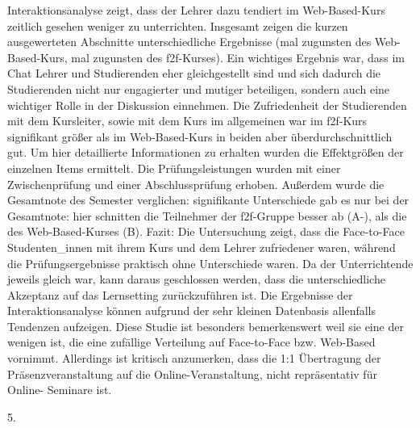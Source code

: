 \documentclass[12pt, bibliography=totoc]{scrartcl}
\begin{document}
Interaktionsanalyse zeigt, dass der Lehrer dazu tendiert im
Web-Based-Kurs zeitlich gesehen weniger zu unterrichten. Insgesamt
zeigen die kurzen ausgewerteten Abschnitte unterschiedliche Ergebnisse
(mal zugunsten des Web-Based-Kurs, mal zugunsten des f2f-Kurses). Ein
wichtiges Ergebnis war, dass im Chat Lehrer und Studierenden eher
gleichgestellt sind und sich dadurch die Studierenden nicht nur
engagierter und mutiger beteiligen, sondern auch eine wichtiger Rolle in
der Diskussion einnehmen. Die Zufriedenheit der Studierenden mit dem
Kursleiter, sowie mit dem Kurs im allgemeinen war im f2f-Kurs
signifikant größer als im Web-Based-Kurs in beiden aber
überdurchschnittlich gut. Um hier detaillierte Informationen zu erhalten
wurden die Effektgrößen der einzelnen Items ermittelt. Die
Prüfungsleistungen wurden mit einer Zwischenprüfung und einer
Abschlussprüfung erhoben. Außerdem wurde die Gesamtnote des Semester
verglichen: signifikante Unterschiede gab es nur bei der Gesamtnote:
hier schnitten die Teilnehmer der f2f-Gruppe besser ab (A-), als die des
Web-Based-Kurses (B). Fazit: Die Untersuchung zeigt, dass die
Face-to-Face Studenten\_innen mit ihrem Kurs und dem Lehrer zufriedener
waren, während die Prüfungsergebnisse praktisch ohne Unterschiede waren.
Da der Unterrichtende jeweils gleich war, kann daraus geschlossen
werden, dass die unterschiedliche Akzeptanz auf das Lernsetting
zurückzuführen ist. Die Ergebnisse der Interaktionsanalyse können
aufgrund der sehr kleinen Datenbasis allenfalls Tendenzen aufzeigen.
Diese Studie ist besonders bemerkenswert weil sie eine der wenigen ist,
die eine zufällige Verteilung auf Face-to-Face bzw. Web-Based vornimmt.
Allerdings ist kritisch anzumerken, dass die 1:1 Übertragung der
Präsenzveranstaltung auf die Online-Veranstaltung, nicht repräsentativ
für Online- Seminare ist.

5.
\end{document}

